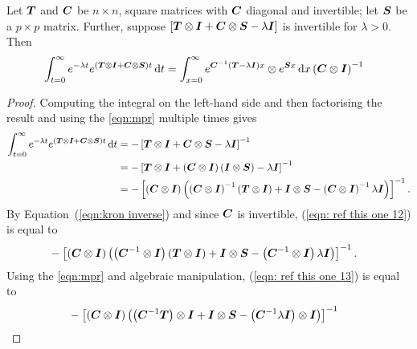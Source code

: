 \begin{lem}\label{lem: lst mpr}
	Let \(\boldsymbol{T}\) and \(\boldsymbol{C}\) be \(n\times n\), square matrices with \(\boldsymbol{C}\) diagonal and invertible; let \(\boldsymbol{S}\) be a \(p\times p\) matrix. Further, suppose \(\left[\boldsymbol{T}\otimes \boldsymbol{I} + \boldsymbol{C}\otimes \boldsymbol{S} - \lambda \boldsymbol{I}\right]\) is invertible for \(\lambda>0\). Then
\begin{align}
	&\int_{t=0}^\infty e^{-\lambda t}  e^{{\left(\boldsymbol{T}\otimes \boldsymbol{I} + \boldsymbol{C}\otimes \boldsymbol{S}\right)t}} \, \mathrm{d} t 
	=   \int_{x=0}^\infty e^{{\boldsymbol{C}^{-1}\left(\boldsymbol{T}-\lambda \boldsymbol{I}\right)x}}\otimes e^{\boldsymbol{S}x} \, \mathrm{d} x \left(\boldsymbol{C}\otimes \boldsymbol{I}\right)^{-1}  \label{eqn:lstsimplify}\end{align}
\end{lem}
\begin{proof}
	Computing the integral on the left-hand side and then factorising the result and using the \ref{eqn:mpr} multiple times gives
	\begin{align}
            	\int_{t=0}^\infty e^{-\lambda t} e^{\left(\boldsymbol{T}\otimes \boldsymbol{I} + \boldsymbol{C}\otimes \boldsymbol{S}\right)t} \, \mathrm{d} t\nonumber 
            	&= - \left[\boldsymbol{T}\otimes \boldsymbol{I} + \boldsymbol{C}\otimes \boldsymbol{S} - \lambda \boldsymbol{I}\right]^{-1}
		\\&= -  \left[\boldsymbol{T}\otimes \boldsymbol{I} + \left(\boldsymbol{C}\otimes \boldsymbol{I}\right)\left(\boldsymbol{I}\otimes \boldsymbol{S}\right) - \lambda \boldsymbol{I}\right]^{-1}\nonumber
		\\&= -  \left[\left(\boldsymbol{C}\otimes \boldsymbol{I}\right)\left(\left(\boldsymbol{C}\otimes \boldsymbol{I}\right)^{-1}\left(\boldsymbol{T}\otimes \boldsymbol{I} \right)+ \boldsymbol{I}\otimes \boldsymbol{S} - \left(\boldsymbol{C}\otimes \boldsymbol{I}\right)^{-1}\lambda \boldsymbol{I}\right)\right]^{-1}. \label{eqn: ref this one 12}
	\end{align}
	By Equation~(\ref{eqn:kron inverse}) and since \(\boldsymbol{C}\) is invertible, (\ref{eqn: ref this one 12}) is equal to
	\begin{align}
		& - \left[\left(\boldsymbol{C}\otimes \boldsymbol{I}\right)\left(\left(\boldsymbol{C}^{-1}\otimes \boldsymbol{I}\right)\left(\boldsymbol{T}\otimes \boldsymbol{I} \right)+ \boldsymbol{I}\otimes \boldsymbol{S} - \left(\boldsymbol{C}^{-1}\otimes \boldsymbol{I}\right)\lambda \boldsymbol{I}\right)\right]^{-1}. \label{eqn: ref this one 13}
	\end{align}
	{Using the \ref{eqn:mpr} and algebraic manipulation, (\ref{eqn: ref this one 13}) is equal to }
	\begin{align}
		&- \left[\left(\bs{C}\otimes \bs{I}\right)\left(\left(\bs{C}^{-1}\bs{T}\right)\otimes \bs{I} + \bs{I}\otimes \bs{S} - \left(\bs{C}^{-1}\lambda \bs{I}\right)\otimes \bs{I}\right)\right]^{-1} \nonumber

\end{align}
\end{proof}
